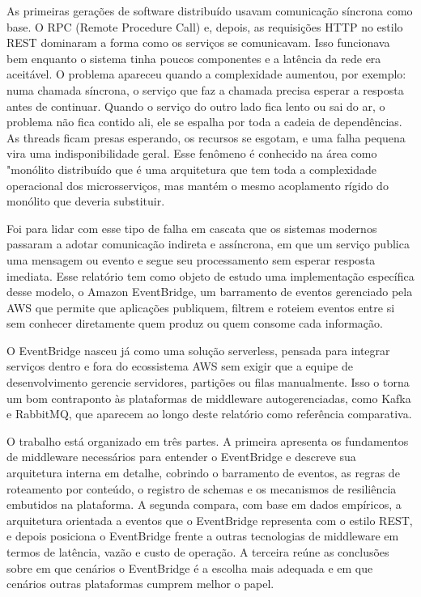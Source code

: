 \documentclass[12pt, a4paper]{article}
\begin{document}
As primeiras gerações de software distribuído usavam comunicação síncrona como base. O RPC (Remote Procedure Call) e, depois, as requisições HTTP no estilo REST dominaram a forma como os serviços se comunicavam. Isso funcionava bem enquanto o sistema tinha poucos componentes e a latência da rede era aceitável. O problema apareceu quando a complexidade aumentou, por exemplo: numa chamada síncrona, o serviço que faz a chamada precisa esperar a resposta antes de continuar. Quando o serviço do outro lado fica lento ou sai do ar, o problema não fica contido ali, ele se espalha por toda a cadeia de dependências. As threads ficam presas esperando, os recursos se esgotam, e uma falha pequena vira uma indisponibilidade geral. Esse fenômeno é conhecido na área como "monólito distribuído que é uma arquitetura que tem toda a complexidade operacional dos microsserviços, mas mantém o mesmo acoplamento rígido do monólito que deveria substituir.

Foi para lidar com esse tipo de falha em cascata que os sistemas modernos passaram a adotar comunicação indireta e assíncrona, em que um serviço publica uma mensagem ou evento e segue seu processamento sem esperar resposta imediata. Esse relatório tem como objeto de estudo uma implementação específica desse modelo, o Amazon EventBridge, um barramento de eventos gerenciado pela AWS que permite que aplicações publiquem, filtrem e roteiem eventos entre si sem conhecer diretamente quem produz ou quem consome cada informação.

O EventBridge nasceu já como uma solução serverless, pensada para integrar serviços dentro e fora do ecossistema AWS sem exigir que a equipe de desenvolvimento gerencie servidores, partições ou filas manualmente. Isso o torna um bom contraponto às plataformas de middleware autogerenciadas, como Kafka e RabbitMQ, que aparecem ao longo deste relatório como referência comparativa.

O trabalho está organizado em três partes. A primeira apresenta os fundamentos de middleware necessários para entender o EventBridge e descreve sua arquitetura interna em detalhe, cobrindo o barramento de eventos, as regras de roteamento por conteúdo, o registro de schemas e os mecanismos de resiliência embutidos na plataforma. A segunda compara, com base em dados empíricos, a arquitetura orientada a eventos que o EventBridge representa com o estilo REST, e depois posiciona o EventBridge frente a outras tecnologias de middleware em termos de latência, vazão e custo de operação. A terceira reúne as conclusões sobre em que cenários o EventBridge é a escolha mais adequada e em que cenários outras plataformas cumprem melhor o papel.
\end{document}
